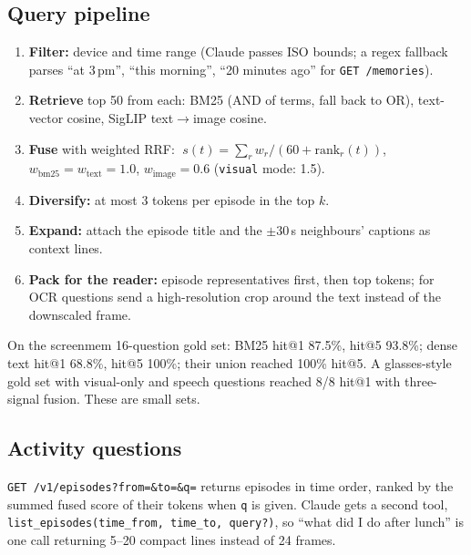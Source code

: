 \documentclass[11pt,a4paper]{article}
\begin{document}
\subsection{Query pipeline}
\begin{enumerate}
  \item \textbf{Filter:} device and time range (Claude passes ISO bounds; a regex fallback parses ``at 3\,pm'', ``this morning'', ``20 minutes ago'' for \texttt{GET /memories}).
  \item \textbf{Retrieve} top 50 from each: BM25 (AND of terms, fall back to OR), text-vector cosine, SigLIP text$\rightarrow$image cosine.
  \item \textbf{Fuse} with weighted RRF: $\;s(t)=\sum_r w_r/(60+\mathrm{rank}_r(t))$, $w_\text{bm25}=w_\text{text}=1.0$, $w_\text{image}=0.6$ (\texttt{visual} mode: 1.5).
  \item \textbf{Diversify:} at most 3 tokens per episode in the top $k$.
  \item \textbf{Expand:} attach the episode title and the $\pm$30\,s neighbours' captions as context lines.
  \item \textbf{Pack for the reader:} episode representatives first, then top tokens; for OCR questions send a high-resolution crop around the text instead of the downscaled frame.
\end{enumerate}
\begin{measured}
On the screenmem 16-question gold set: BM25 hit@1 87.5\%, hit@5 93.8\%; dense text hit@1 68.8\%, hit@5 100\%; their union reached 100\% hit@5. A glasses-style gold set with visual-only and speech questions reached 8/8 hit@1 with three-signal fusion. These are small sets.
\end{measured}

\subsection{Activity questions}
\texttt{GET /v1/episodes?from=\&to=\&q=} returns episodes in time order, ranked by the summed fused score of their tokens when \texttt{q} is given. Claude gets a second tool, \texttt{list\_episodes(time\_from, time\_to, query?)}, so ``what did I do after lunch'' is one call returning 5--20 compact lines instead of 24 frames.

\end{document}
